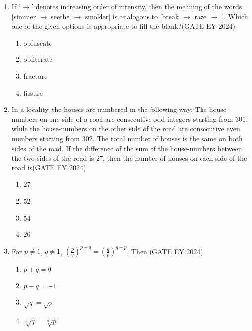 \begin{enumerate}
\item If `$\rightarrow$' denotes increasing order of intensity, then the meaning of the words [simmer $\rightarrow$ seethe $\rightarrow$ smolder] is analogous to [break $\rightarrow$ raze $\rightarrow$ \underline{\hspace{3cm}} ]. Which one of the given options is appropriate to fill the blank?\hfill{(GATE EY 2024)}
\begin{multicols}{2}
\begin{enumerate}
\item obfuscate
\item obliterate
\item fracture
\item fissure
\end{enumerate}
\end{multicols}


\item In a locality, the houses are numbered in the following way: The house-numbers on one side of a road are consecutive odd integers starting from $301$, while the house-numbers on the other side of the road are consecutive even numbers starting from $302$. The total number of houses is the same on both sides of the road. If the difference of the sum of the house-numbers between the two sides of the road is $27$, then the number of houses on each side of the road is\hfill{(GATE EY 2024)}
\begin{multicols}{2}
\begin{enumerate}
\item $27$
\item $52$
\item $54$
\item $26$
\end{enumerate}
\end{multicols}


\item For $p \neq 1$, $q \neq 1$, $(\frac{p}{q})^{p-q} = (\frac{q}{p})^{q-p}$. Then \hfill{(GATE EY 2024)}
\begin{multicols}{2}
\begin{enumerate}
\item $p+q = 0$
\item $p-q = -1$
\item $\sqrt{q} = \sqrt{p}$
\item $\sqrt[p]{q} = \sqrt[q]{p}$
\end{enumerate}
\end{multicols}



\end{enumerate}
